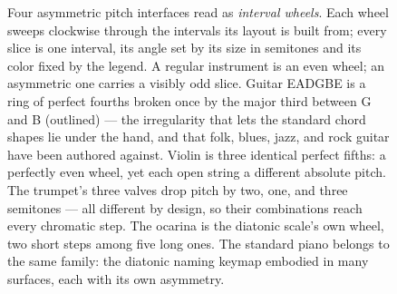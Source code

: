 \documentclass[10pt,letterpaper,twocolumn]{article}
\begin{document}
\begin{figure}[t]
{}
\endgroup
\caption{Four asymmetric pitch interfaces read as \emph{interval wheels}. Each wheel sweeps clockwise through the intervals its layout is built from; every slice is one interval, its angle set by its size in semitones and its color fixed by the legend. A regular instrument is an even wheel; an asymmetric one carries a visibly odd slice. Guitar EADGBE is a ring of perfect fourths broken once by the major third between G and B (outlined) --- the irregularity that lets the standard chord shapes lie under the hand, and that folk, blues, jazz, and rock guitar have been authored against. Violin is three identical perfect fifths: a perfectly even wheel, yet each open string a different absolute pitch. The trumpet's three valves drop pitch by two, one, and three semitones --- all different by design, so their combinations reach every chromatic step. The ocarina is the diatonic scale's own wheel, two short steps among five long ones. The standard piano belongs to the same family: the diatonic naming keymap embodied in many surfaces, each with its own asymmetry.}
\label{fig:asymmetric-instruments}
\end{figure}
\end{document}
